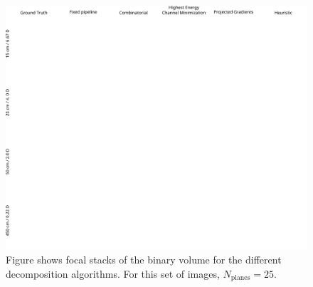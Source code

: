 \begin{figure}[!htb]
\centering
\includegraphics[width=0.99\columnwidth]{images/volumetric/acd_exp4/exp_FS}
\caption[Adaptive color decomposition: focal stack]{Figure shows focal stacks of the binary volume for the different decomposition algorithms. For this set of images, $N_{\text{planes}}=25$.}
\label{fig:volumetric:acd:exp4:focalstack}
\end{figure}

